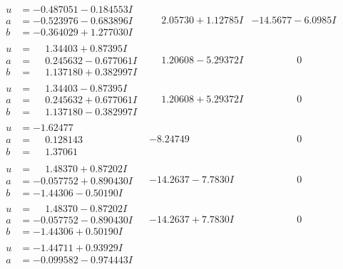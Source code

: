 \documentclass[1p]{elsarticle_modified}
\theoremstyle{definition}
\begin{document}
$$\begin{array}{c|c|c}
 \hline 
\begin{aligned}
u &= -0.487051 - 0.184553 I \\
a &= -0.523976 - 0.683896 I \\
b &= -0.364029 + 1.277030 I\end{aligned}
 & \phantom{-}2.05730 + 1.12785 I & -14.5677 - 6.0985 I \\ \hline\begin{aligned}
u &= \phantom{-}1.34403 + 0.87395 I \\
a &= \phantom{-}0.245632 - 0.677061 I \\
b &= \phantom{-}1.137180 + 0.382997 I\end{aligned}
 & \phantom{-}1.20608 - 5.29372 I & \phantom{-0.000000 } 0 \\ \hline\begin{aligned}
u &= \phantom{-}1.34403 - 0.87395 I \\
a &= \phantom{-}0.245632 + 0.677061 I \\
b &= \phantom{-}1.137180 - 0.382997 I\end{aligned}
 & \phantom{-}1.20608 + 5.29372 I & \phantom{-0.000000 } 0 \\ \hline\begin{aligned}
u &= -1.62477\phantom{ +0.000000I} \\
a &= \phantom{-}0.128143\phantom{ +0.000000I} \\
b &= \phantom{-}1.37061\phantom{ +0.000000I}\end{aligned}
 & -8.24749\phantom{ +0.000000I} & \phantom{-0.000000 } 0 \\ \hline\begin{aligned}
u &= \phantom{-}1.48370 + 0.87202 I \\
a &= -0.057752 + 0.890430 I \\
b &= -1.44306 - 0.50190 I\end{aligned}
 & -14.2637 - 7.7830 I & \phantom{-0.000000 } 0 \\ \hline\begin{aligned}
u &= \phantom{-}1.48370 - 0.87202 I \\
a &= -0.057752 - 0.890430 I \\
b &= -1.44306 + 0.50190 I\end{aligned}
 & -14.2637 + 7.7830 I & \phantom{-0.000000 } 0 \\ \hline\begin{aligned}
u &= -1.44711 + 0.93929 I \\
a &= -0.099582 - 0.974443 I \\

\end{aligned}
\end{array}$$
\end{document}
